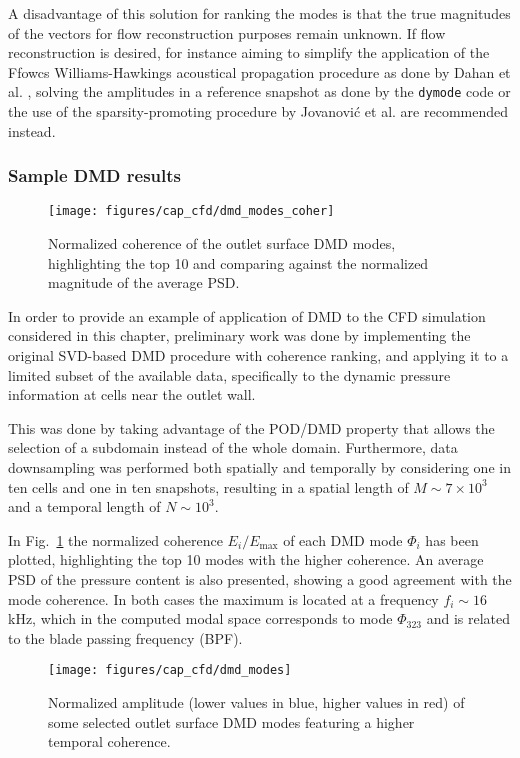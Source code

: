 A disadvantage of this solution for ranking the modes is that the true magnitudes of the vectors for flow reconstruction purposes remain unknown. If flow reconstruction is desired, for instance aiming to simplify the application of the Ffowcs Williams-Hawkings acoustical propagation procedure \cite{williams1969sound} as done by Dahan et al. \cite{dahan2014aero}, solving the amplitudes in a reference snapshot as done by the \texttt{dymode} code \cite{futrzynski2015dymode} or the use of the sparsity-promoting procedure by Jovanovi{\'c} et al. \cite{jovanovic2014sparsity} are recommended instead.

\subsubsection{Sample DMD results}

\begin{figure}[b!]
\centering
\texttt{[image: figures/cap\_cfd/dmd\_modes\_coher]}
\caption{Normalized coherence of the outlet surface DMD modes, highlighting the top 10 and comparing against the normalized magnitude of the average PSD.}
\label{fig:dmd_modes_coher}
\end{figure}

In order to provide an example of application of DMD to the CFD simulation considered in this chapter, preliminary work was done by implementing the original SVD-based DMD procedure with coherence ranking, and applying it to a limited subset of the available data, specifically to the dynamic pressure information at cells near the outlet wall.

This was done by taking advantage of the POD/DMD property that allows the selection of a subdomain instead of the whole domain. Furthermore, data downsampling was performed both spatially and temporally by considering one in ten cells and one in ten snapshots, resulting in a spatial length of $M\sim 7\times 10^3$ and a temporal length of $N\sim 10^3$.

In Fig.~\ref{fig:dmd_modes_coher} the normalized coherence $E_i/E_\text{max}$ of each DMD mode $\Phi_i$ has been plotted, highlighting the top 10 modes with the higher coherence. An average PSD of the pressure content is also presented, showing a good agreement with the mode coherence. In both cases the maximum is located at a frequency $f_i\sim 16$ kHz, which in the computed modal space corresponds to mode $\Phi_{323}$ and is related to the blade passing frequency (BPF).

\begin{figure}[htb!]
\centering
\texttt{[image: figures/cap\_cfd/dmd\_modes]}
\caption{Normalized amplitude (lower values in blue, higher values in red) of some selected outlet surface DMD modes featuring a higher temporal coherence.}
\label{fig:dmd_modes}
\end{figure}

